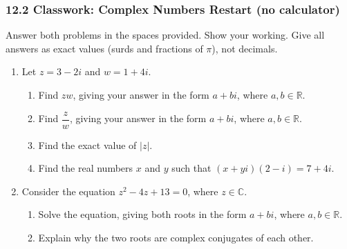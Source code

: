 \documentclass[12pt, twoside]{article}
\begin{document}
\subsubsection*{12.2 Classwork: Complex Numbers Restart (no calculator)}

Answer both problems in the spaces provided. Show your working. Give
all answers as exact values (surds and fractions of $\pi$), not decimals.

\begin{enumerate}[itemsep=0.15cm]

\item[1.]

Let $z = 3 - 2i$ and $w = 1 + 4i$.

\begin{enumerate}[itemsep=0.15cm]
  \item Find $zw$, giving your answer in the form $a + bi$, where
  $a, b \in \mathbb{R}$.
  \item Find $\dfrac{z}{w}$, giving your answer in the form $a + bi$, where
  $a, b \in \mathbb{R}$.
  \item Find the exact value of $|z|$.
  \item Find the real numbers $x$ and $y$ such that
  $(x + yi)(2 - i) = 7 + 4i$.
\end{enumerate}


\newpage

\item[2.]

Consider the equation $z^2 - 4z + 13 = 0$, where $z \in \mathbb{C}$.

\begin{enumerate}[itemsep=0.15cm]
  \item Solve the equation, giving both roots in the form $a + bi$, where
  $a, b \in \mathbb{R}$.
  \item Explain why the two roots are complex conjugates of each other.

\end{enumerate}


\end{enumerate}
\end{document}
